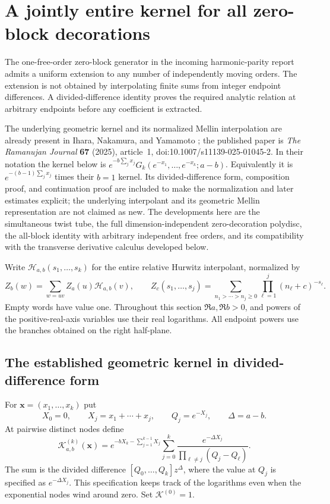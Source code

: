 \section{A jointly entire kernel for all zero-block decorations}
\label{zbg:section}

The one-free-order zero-block generator in the incoming harmonic-parity
report admits a uniform extension to any number of independently moving
orders.  The extension is not obtained by interpolating finite sums from
integer endpoint differences.  A divided-difference identity proves the
required analytic relation at arbitrary endpoints before any coefficient
is extracted.

The underlying geometric kernel and its normalized Mellin interpolation
are already present in Ihara, Nakamura, and Yamamoto
\cite[Proposition~3.3 and Theorem~4.1]{INY}; the published paper is
\emph{The Ramanujan Journal} \textbf{67} (2025), article~1,
doi:10.1007/s11139-025-01045-2.  In their notation the kernel below is
$e^{-b\sum_jx_j}G_k(e^{-x_1},\ldots,e^{-x_k};a-b)$.
Equivalently it is $e^{-(b-1)\sum_jx_j}$ times their $b=1$ kernel.
Its divided-difference form, composition proof, and continuation proof
are included to make the normalization and later estimates explicit;
the underlying interpolant and its geometric Mellin representation are
not claimed as new.  The developments here are the simultaneous twist
tube, the full dimension-independent zero-decoration polydisc, the
all-block identity with arbitrary independent free orders, and its
compatibility with the transverse derivative calculus developed below.

Write $\mathcal H_{a,b}(s_1,\ldots,s_k)$ for the entire relative
Hurwitz interpolant, normalized by
\[
 Z_b(w)=\sum_{w=uv} Z_a(u)\mathcal H_{a,b}(v),\qquad
 Z_c(s_1,\ldots,s_j)=\sum_{n_1>\cdots>n_j\geq0}
                         \prod_{\ell=1}^j(n_\ell+c)^{-s_\ell}.
\]
Empty words have value one.  Throughout this section
$\Re a,\Re b>0$, and powers of the positive-real-axis variables use
their real logarithms.  All endpoint powers use the branches obtained
on the right half-plane.

\subsection{The established geometric kernel in divided-difference form}

For $\boldsymbol x=(x_1,\ldots,x_k)$ put
\[
 X_0=0,\qquad X_j=x_1+\cdots+x_j,\qquad Q_j=e^{-X_j},\qquad
 \Delta=a-b.
\]
At pairwise distinct nodes define
\begin{equation}\label{zbg:kernel}
 \mathscr K_{a,b}^{(k)}(\boldsymbol x)
 =e^{-bX_k-\sum_{j=1}^{k-1}X_j}
       \sum_{j=0}^k
       \frac{e^{-\Delta X_j}}{\prod_{\ell\ne j}(Q_j-Q_\ell)}.
\end{equation}
The sum is the divided difference
$[Q_0,\ldots,Q_k]z^\Delta$, where the value at $Q_j$ is specified
as $e^{-\Delta X_j}$.  This specification keeps track of the
logarithms even when the exponential nodes wind around zero.  Set
$\mathscr K^{(0)}=1$.

